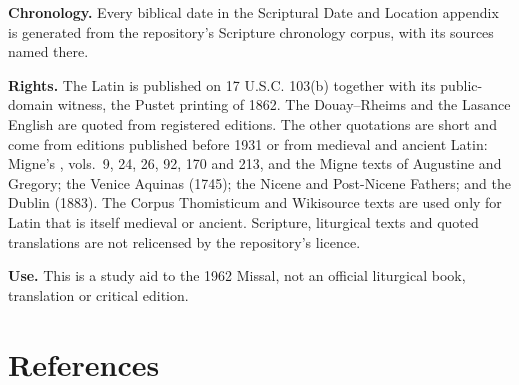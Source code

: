 {\textbf{Chronology.} Every biblical date in the Scriptural Date and Location
appendix is generated from the repository's Scripture chronology corpus,
with its sources named there.

\textbf{Rights.} The Latin is published on 17 U.S.C. 103(b) together with its
public-domain witness, the Pustet printing of 1862. The Douay--Rheims and the
Lasance English are quoted from registered editions. The other quotations are
short and come from editions published before 1931 or from medieval and
ancient Latin: Migne's , vols.~9, 24, 26, 92, 170 and
213, and the Migne texts of Augustine and Gregory; the Venice Aquinas (1745);
the Nicene and Post-Nicene Fathers; and the Dublin 
(1883). The Corpus Thomisticum and Wikisource texts are used only for Latin
that is itself medieval or ancient. Scripture, liturgical texts and quoted
translations are not relicensed by the repository's licence.

\textbf{Use.} This is a study aid to the 1962 Missal, not an official
liturgical book, translation or critical edition.
\par}

\section{References}
\label{sec:references}

